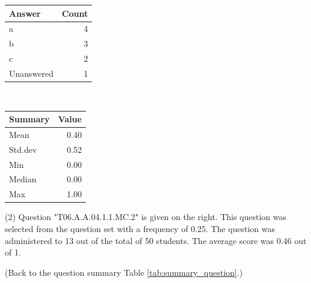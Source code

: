 \documentclass[12pt,english,nohyper]{tufte-handout}\usepackage[]{graphicx}\usepackage[]{color}
\begin{document}
\begin{center}%
\begin{tabular}{lr}
  \hline
Answer & Count \\ 
  \hline
a &   4 \\ 
  b &   3 \\ 
  c &   2 \\ 
  Unanswered &   1 \\ 
   \hline
\end{tabular}
~~~~~~~~%
\begin{tabular}{lr}
  \hline
Summary & Value \\ 
  \hline
Mean & 0.40 \\ 
  Std.dev & 0.52 \\ 
  Min & 0.00 \\ 
  Median & 0.00 \\ 
  Max & 1.00 \\ 
   \hline
\end{tabular}
\end{center}\newpage{} (2) Question "T06.A.A.04.1.1.MC.2" is given on the right. This question was selected from the question set with a frequency of 0.25. The question was administered to 13 out of the total of 50 students. The average score was 0.46 out of 1.

 (Back to the question summary Table \ref{tab:summary_question}.)
\end{document}
